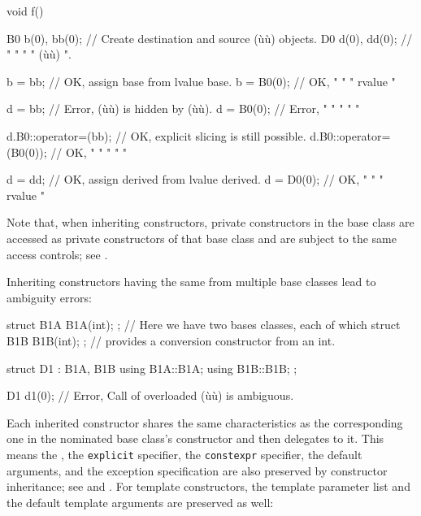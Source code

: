 \begin{emcppslisting}[emcppsbatch=e1]
void f()
{
    B0 b(0), bb(0);  // Create destination and source (ù{}ù) objects.
    D0 d(0), dd(0);  //   "         "       "    "    (ù{}ù)    ".

    b = bb;          // OK, assign base from lvalue base.
    b = B0(0);       // OK,   "       "   "  rvalue   "

    d = bb;          // Error, (ù{}ù) is hidden by (ù{}ù).
    d = B0(0);       // Error,       "         "    "     "        "

    d.B0::operator=(bb);     // OK, explicit slicing is still possible.
    d.B0::operator=(B0(0));  // OK,    "         "      "   "      "

    d = dd;          // OK, assign derived from lvalue derived.
    d = D0(0);       // OK,   "        "     "  rvalue    "
}
\end{emcppslisting}
    
\noindent Note that, when inheriting constructors, private constructors in the
base class are accessed as private constructors of that base class and
are subject to the same access controls; see . 

Inheriting constructors having the same  from multiple
base classes lead to ambiguity errors:

\begin{emcppslisting}
struct B1A { B1A(int); }; // Here we have two bases classes, each of which
struct B1B { B1B(int); }; // provides a conversion constructor from an int.

struct D1 : B1A, B1B
{
    using B1A::B1A;
    using B1B::B1B;
};

D1 d1(0);  // Error, Call of overloaded (ù{}ù) is ambiguous.
\end{emcppslisting}
    
\noindent Each inherited constructor shares the same characteristics as the
corresponding one in the nominated base class's constructor and then
delegates to it. This means the , the
\lstinline!explicit! specifier, the \lstinline!constexpr! specifier, the
default arguments, and the exception specification are also preserved by
constructor inheritance; see  and .  
For template
constructors, the template parameter list and the default template
arguments are preserved as well:

